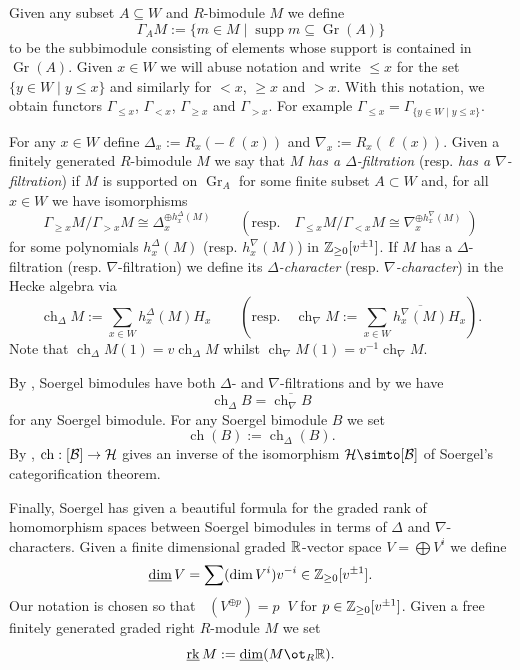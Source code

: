 \documentclass[11pt]{amsart}
\numberwithin{equation}{section}
\def\ov{\overline}
\def\un{\underline}
\def\to{\rightarrow}
\DeclareMathOperator{\supp}{supp} \DeclareMathOperator{\ch}{ch}
\theoremstyle{definition}
\theoremstyle{remark}
\DeclareMathOperator{\Gr}{Gr}
\DeclareMathOperator{\rk}{rk}
\DeclareMathOperator{\gdim}{\un{\dim}}
\DeclareMathOperator{\grk}{\un{\rk}}
\begin{document}
Given any subset $A \subseteq W$ and $R$-bimodule $M$ we define
\[
\Gamma_A M := \{ m \in M \; | \; \supp m \subseteq \Gr(A) \}
\]
to be the subbimodule consisting of elements whose support is contained in $\Gr(A)$. 
Given $x \in W$ we will abuse notation and write $\le x$ for the set
$\{ y \in W \; | \; y \le x \}$ and similarly for $<x$, $\ge x$ and $>
x$. With this notation, we obtain functors $\Gamma_{\le x}$, $\Gamma_{< x}$,
$\Gamma_{\ge x}$ and $\Gamma_{> x}$. For example $\Gamma_{\le x} =
\Gamma_{\{ y \in W \; | \; y \le x \}}$.

For any $x \in W$ define  $\Delta_x := R_x(-\ell(x))$ and  $\nabla_x
:= R_x(\ell(x))$.
Given a finitely generated $R$-bimodule $M$ we say that $M$ \emph{has
  a $\Delta$-filtration} (resp. \emph{has a $\nabla$-filtration}) if
$M$ is supported on $\Gr_A$ for some finite subset $A \subset W$ and,
for all $x \in W$ we have isomorphisms
\[
\Gamma_{\ge x} M / \Gamma_{> x} M \cong \Delta_x^{\oplus
  h^{\Delta}_x(M)} 
\qquad ( \text{resp.} \quad \Gamma_{\le x} M / \Gamma_{< x} M \cong
\nabla_x^{\oplus  h^{\nabla}_x(M)} \; )
\]
for some polynomials $h^{\Delta}_x(M)$ (resp. $h^{\nabla}_x(M)$) in
${\mathbb{Z}}_{\ge 0}[v^{\pm 1}]$. If $M$ has a $\Delta$-filtration
(resp. $\nabla$-filtration) we define its \emph{$\Delta$-character}
(resp. \emph{$\nabla$-character}) in the Hecke algebra via
\[
\ch_\Delta M := \sum_{ x \in W}   h^{\Delta}_x(M) H_x
\qquad ( \text{resp.} \quad 
\ch_\nabla M := \sum_{ x \in W}   \overline{h^{\nabla}_x(M)} H_x).
\]
Note that $\ch_\Delta M(1) = v\ch_\Delta M$ whilst
$\ch_{\nabla} M(1) = v^{-1}\ch_{\nabla} M$.

By \cite[Propositions 5.7 and 5.9]{S3}, Soergel bimodules have both $\Delta$-
and $\nabla$-filtrations and by \cite[Bemerkung 6.16]{S3} we have
\[
\ch_\Delta B = \ov{\ch_\nabla B}
\]
for any Soergel bimodule. For any Soergel bimodule $B$ we set
\[
\ch(B) := \ch_\Delta(B).\]
By \cite[Theorem 5.3]{S3}, $\ch : [\BC] \to \HC$
gives an inverse of the isomorphism
$\HC \simto [\BC]$ of Soergel's categorification theorem.

Finally, Soergel has given a beautiful formula for the graded rank of
homomorphism spaces between Soergel bimodules in terms of $\Delta$ and
$\nabla$-characters. Given a finite dimensional
graded ${\mathbb{R}}$-vector space $V = \bigoplus 
V^i$ we define \[ \gdim V = \sum (\dim V^i) v^{-i} \in \ZM_{\ge 0}[v^{\pm
  1}]. \] Our notation is chosen so that $\gdim (V^{\oplus p}) = p
\gdim V$ for $p \in {\mathbb{Z}}_{\ge 0}[v^{\pm 1}]$. Given a free finitely generated
graded right $R$-module $M$ we set \[ \grk M := \gdim (M \ot_R
\RM). \]
\end{document}

